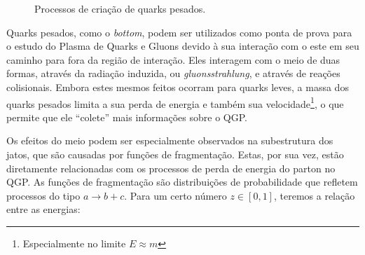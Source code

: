 \begin{figure}[!hbt]
\begin{floatrow}
 
 
 \end{floatrow}

 
 \caption{Processos de criação de quarks pesados.}
 \label{criacao}
\end{figure}


Quarks pesados, como o \emph{bottom}, podem ser utilizados como ponta de prova para o estudo do Plasma de Quarks e Gluons
devido à sua interação com o este em seu caminho para fora da região de interação\cite{li_inverting_2017,renk_jet_2014}. Eles
interagem com o meio de duas formas, através da radiação induzida, ou \emph{gluonsstrahlung}, e através de reações colisionais.
Embora estes mesmos feitos ocorram para quarks leves, a massa dos quarks pesados limita a sua perda de energia e também sua
velocidade\footnote{Especialmente no limite $E \approx m$}, o que permite que ele ``colete'' mais informações sobre o QGP.
\par
Os efeitos do meio podem ser especialmente observados na subestrutura dos jatos, que são causadas por funções de fragmentação.
Estas, por sua vez, estão diretamente relacionadas com os processos de perda de energia do parton no QGP. As funções de fragmentação
são distribuições de probabilidade que refletem processos do tipo $a \longrightarrow b+c$. Para um certo número $z \in [0,1]$, teremos
a relação entre as energias:


